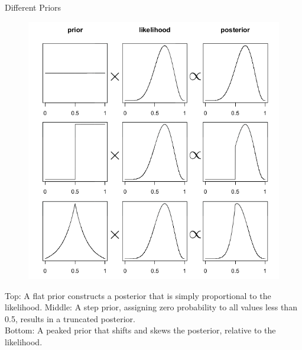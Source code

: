 \documentclass[handout]{beamer}
\begin{document}
\begin{frame}{Different Priors}
\scriptsize{

\begin{figure}[h!]
	\centering
	\includegraphics[scale=0.285]{pics/priorsGlobe.png}
\end{figure}
 
Top: A flat prior constructs a posterior that is simply
proportional to the likelihood. Middle: A step prior, assigning zero probability to all values less than 0.5, results in a truncated posterior. \\ Bottom: A peaked prior that shifts and skews the posterior, relative to the likelihood.
} 

\end{frame}
\end{document}
